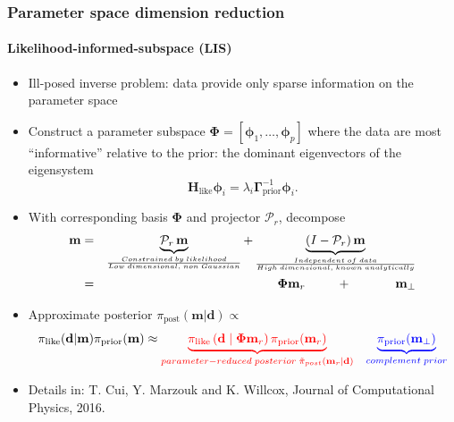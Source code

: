 \documentclass{beamer}
\begin{document}
\begin{frame}
  \frametitle{Parameter space dimension reduction}
  \framesubtitle{Likelihood-informed-subspace (LIS)}

  \setlength{\leftmargini}{8pt}
  \begin{itemize}
    \item Ill-posed inverse problem: data provide only sparse information on
      the parameter space
    \item Construct a parameter subspace $\boldsymbol{\Phi} =
      [\boldsymbol{\phi}_1, \ldots, \boldsymbol{\phi}_p]$ where the data are
      most “informative” relative to the prior: the dominant eigenvectors of
      the eigensystem
      \[
        \mathbf{H}_\text{like} \boldsymbol{\phi}_i = \lambda_i
        \boldsymbol{\Gamma}_\text{prior}^{-1} \boldsymbol{\phi}_i.
      \]
    \item With corresponding basis $\boldsymbol{\Phi}$ and projector $\mathcal{P}_r$, decompose
      \begin{eqnarray*}
        \mathbf{m} & = & \underbrace{ \mathcal{P}_r \, \mathbf{m}
        }_{\frac{Constrained\;by\;likelihood}{Low\;dimensional,\;non\;Gaussian}}
        + \underbrace{ (I - \mathcal{P}_r) \,
        \mathbf{m}}_{\frac{Independent\;of\;data}{High\;dimensional,\;known\;analytically}}
        \\ & = & \hspace{3.5em} \boldsymbol{\Phi} \mathbf{m}_r \hspace{2.5em} +
        \hspace{3.5em} \mathbf{m}_\perp
      \end{eqnarray*}
    \item Approximate posterior $\pi_\text{post}(\mathbf{m}|\mathbf{d}) \propto$
      \[
        \pi_\text{like}(\mathbf{d}|\mathbf{m}) \pi_\text{prior}(\mathbf{m})
        \approx {\color{red} \underbrace{ \pi_\text{like}\left(\mathbf{d}  \mid
            \boldsymbol{\Phi} \mathbf{m}_r \right)
            \pi_\text{prior}(\mathbf{m}_r)}_{parameter-reduced \; posterior \;
          \tilde{\pi}_{post}(\mathbf{m}_r | \mathbf{d})}} \quad {\color{blue}
        \underbrace{\pi_\text{prior}(\mathbf{m}_\perp)}_{complement \;
      prior}}
      \]

  \end{itemize}

  \begin{itemize}
    \tiny
    \item[] Details in: T. Cui, Y. Marzouk and K. Willcox, Journal of
          Computational Physics, 2016.
  \end{itemize}
\end{frame}
\end{document}
